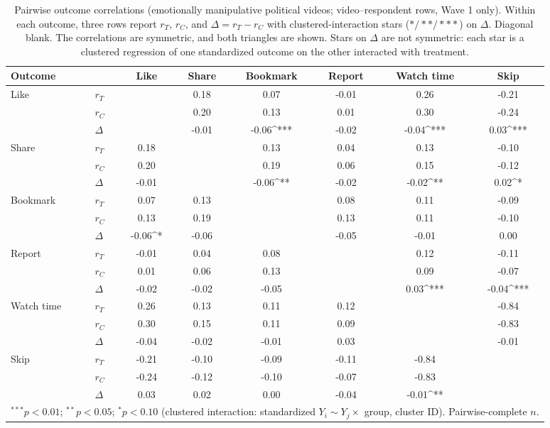 \begin{table}
\begin{center}
\setlength{\tabcolsep}{4pt}
\begin{tabular}{llcccccc}
\hline
Outcome &  & Like & Share & Bookmark & Report & Watch time & Skip \\
\hline
Like & $r_{T}$ &  & 0.18 & 0.07 & -0.01 & 0.26 & -0.21 \\
 & $r_{C}$ &  & 0.20 & 0.13 & 0.01 & 0.30 & -0.24 \\
\rowcolor{ocrow}  & $\Delta$ &  & -0.01 & -0.06^{***} & -0.02 & -0.04^{***} & 0.03^{***} \\
\hline
Share & $r_{T}$ & 0.18 &  & 0.13 & 0.04 & 0.13 & -0.10 \\
 & $r_{C}$ & 0.20 &  & 0.19 & 0.06 & 0.15 & -0.12 \\
\rowcolor{ocrow}  & $\Delta$ & -0.01 &  & -0.06^{**} & -0.02 & -0.02^{**} & 0.02^{*} \\
\hline
Bookmark & $r_{T}$ & 0.07 & 0.13 &  & 0.08 & 0.11 & -0.09 \\
 & $r_{C}$ & 0.13 & 0.19 &  & 0.13 & 0.11 & -0.10 \\
\rowcolor{ocrow}  & $\Delta$ & -0.06^{*} & -0.06 &  & -0.05 & -0.01 & 0.00 \\
\hline
Report & $r_{T}$ & -0.01 & 0.04 & 0.08 &  & 0.12 & -0.11 \\
 & $r_{C}$ & 0.01 & 0.06 & 0.13 &  & 0.09 & -0.07 \\
\rowcolor{ocrow}  & $\Delta$ & -0.02 & -0.02 & -0.05 &  & 0.03^{***} & -0.04^{***} \\
\hline
Watch time & $r_{T}$ & 0.26 & 0.13 & 0.11 & 0.12 &  & -0.84 \\
 & $r_{C}$ & 0.30 & 0.15 & 0.11 & 0.09 &  & -0.83 \\
\rowcolor{ocrow}  & $\Delta$ & -0.04 & -0.02 & -0.01 & 0.03 &  & -0.01 \\
\hline
Skip & $r_{T}$ & -0.21 & -0.10 & -0.09 & -0.11 & -0.84 &  \\
 & $r_{C}$ & -0.24 & -0.12 & -0.10 & -0.07 & -0.83 &  \\
\rowcolor{ocrow}  & $\Delta$ & 0.03 & 0.02 & 0.00 & -0.04 & -0.01^{**} &  \\
\hline
\multicolumn{8}{l}{\scriptsize{$^{***}p<0.01$; $^{**}p<0.05$; $^{*}p<0.10$ (clustered interaction: standardized $Y_i \sim Y_j \times$ group, cluster ID). Pairwise-complete $n$.}} \\
\end{tabular}
\caption{Pairwise outcome correlations (emotionally manipulative political videos; video--respondent rows, Wave 1 only). Within each outcome, three rows report $r_{T}$, $r_{C}$, and $\Delta=r_{T}-r_{C}$ with clustered-interaction stars ($*/**/***$) on $\Delta$. Diagonal blank. The correlations are symmetric, and both triangles are shown. Stars on $\Delta$ are not symmetric: each star is a clustered regression of one standardized outcome on the other interacted with treatment.}
\label{tab:outcome_cors_treat_ctrl}
\end{center}
\end{table}
